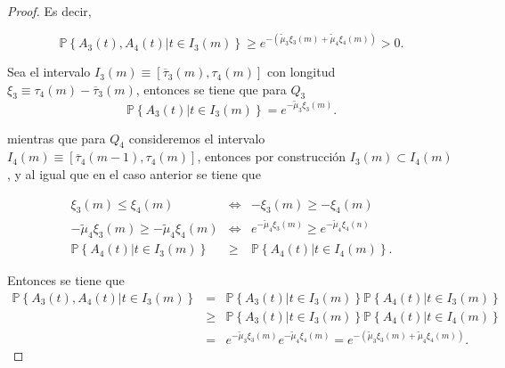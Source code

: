 \documentclass{article}
\newcommand{\prob}{\mathbb{P}}
\begin{document}
\begin{proof}
Es decir, 

\begin{equation}
\prob\left\{A_{3}\left(t\right),A_{4}\left(t\right)|t\in I_{3}\left(m\right)\right\}\geq
e^{-\left(\tilde{\mu}_{3}\xi_{3}\left(m\right)+\tilde{\mu}_{4}\xi_{4}\left(m\right)\right)}>0.
\end{equation}


Sea el intervalo $I_{3}\left(m\right)\equiv\left[\overline{\tau}_{3}\left(m\right),\tau_{4}\left(m\right)\right]$ con longitud $\xi_{3}\equiv\tau_{4}\left(m\right)-\overline{\tau}_{3}\left(m\right)$, entonces se tiene que para $Q_{3}$
\begin{equation}
\prob\left\{A_{3}\left(t\right)|t\in I_{3}\left(m\right)\right\}=e^{-\tilde{\mu}_{3}\xi_{3}\left(m\right)}.
\end{equation} 

mientras que para $Q_{4}$ consideremos el intervalo $I_{4}\left(m\right)\equiv\left[\overline{\tau}_{4}\left(m-1\right),\tau_{4}\left(m\right)\right]$, entonces por construcci\'on  $I_{3}\left(m\right)\subset I_{4}\left(m\right)$, y al igual que en el caso anterior se tiene que 

\begin{eqnarray*}
\xi_{3}\left(m\right)\leq\xi_{4}\left(m\right)&\Leftrightarrow& -\xi_{3}\left(m\right)\geq-\xi_{4}\left(m\right)
\\
-\tilde{\mu}_{4}\xi_{3}\left(m\right)\geq-\tilde{\mu}_{4}\xi_{4}\left(m\right)&\Leftrightarrow&
e^{-\tilde{\mu}_{4}\xi_{3}\left(m\right)}\geq e^{-\tilde{\mu}_{4}\xi_{4}\left(n\right)}\\
\prob\left\{A_{4}\left(t\right)|t\in I_{3}\left(m\right)\right\}&\geq&
\prob\left\{A_{4}\left(t\right)|t\in I_{4}\left(m\right)\right\}.
\end{eqnarray*}


Entonces se tiene que
\small{
\begin{eqnarray*}
\prob\left\{A_{3}\left(t\right),A_{4}\left(t\right)|t\in I_{3}\left(m\right)\right\}&=&
\prob\left\{A_{3}\left(t\right)|t\in I_{3}\left(m\right)\right\}
\prob\left\{A_{4}\left(t\right)|t\in I_{3}\left(m\right)\right\}\\
&\geq&
\prob\left\{A_{3}\left(t\right)|t\in I_{3}\left(m\right)\right\}
\prob\left\{A_{4}\left(t\right)|t\in I_{4}\left(m\right)\right\}\\
&=&e^{-\tilde{\mu}_{3}\xi_{3}\left(m\right)}e^{-\tilde{\mu}_{4}\xi_{4}\left(m\right)}
=e^{-\left(\tilde{\mu}_{3}\xi_{3}\left(m\right)+\tilde{\mu}_{4}\xi_{4}\left(m\right)\right)}.
\end{eqnarray*}}


\end{proof}
\end{document}
